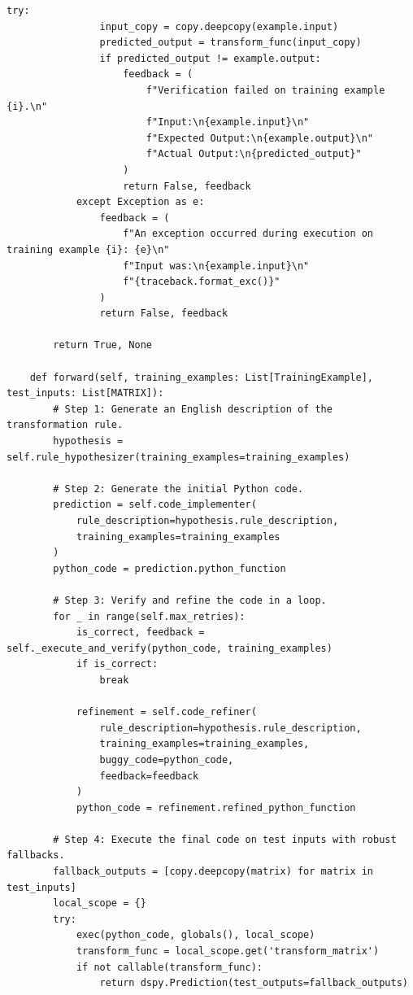 \begin{instructbox}
\begin{lstlisting}[breakindent=0pt, breaklines=true, breakatwhitespace=true, frame=single, backgroundcolor=\color{blue!10}]
            try:
                input_copy = copy.deepcopy(example.input)
                predicted_output = transform_func(input_copy)
                if predicted_output != example.output:
                    feedback = (
                        f"Verification failed on training example {i}.\n"
                        f"Input:\n{example.input}\n"
                        f"Expected Output:\n{example.output}\n"
                        f"Actual Output:\n{predicted_output}"
                    )
                    return False, feedback
            except Exception as e:
                feedback = (
                    f"An exception occurred during execution on training example {i}: {e}\n"
                    f"Input was:\n{example.input}\n"
                    f"{traceback.format_exc()}"
                )
                return False, feedback
        
        return True, None

    def forward(self, training_examples: List[TrainingExample], test_inputs: List[MATRIX]):
        # Step 1: Generate an English description of the transformation rule.
        hypothesis = self.rule_hypothesizer(training_examples=training_examples)
        
        # Step 2: Generate the initial Python code.
        prediction = self.code_implementer(
            rule_description=hypothesis.rule_description,
            training_examples=training_examples
        )
        python_code = prediction.python_function

        # Step 3: Verify and refine the code in a loop.
        for _ in range(self.max_retries):
            is_correct, feedback = self._execute_and_verify(python_code, training_examples)
            if is_correct:
                break
            
            refinement = self.code_refiner(
                rule_description=hypothesis.rule_description,
                training_examples=training_examples,
                buggy_code=python_code,
                feedback=feedback
            )
            python_code = refinement.refined_python_function
        
        # Step 4: Execute the final code on test inputs with robust fallbacks.
        fallback_outputs = [copy.deepcopy(matrix) for matrix in test_inputs]
        local_scope = {}
        try:
            exec(python_code, globals(), local_scope)
            transform_func = local_scope.get('transform_matrix')
            if not callable(transform_func):
                return dspy.Prediction(test_outputs=fallback_outputs)


\end{lstlisting}
\end{instructbox}
